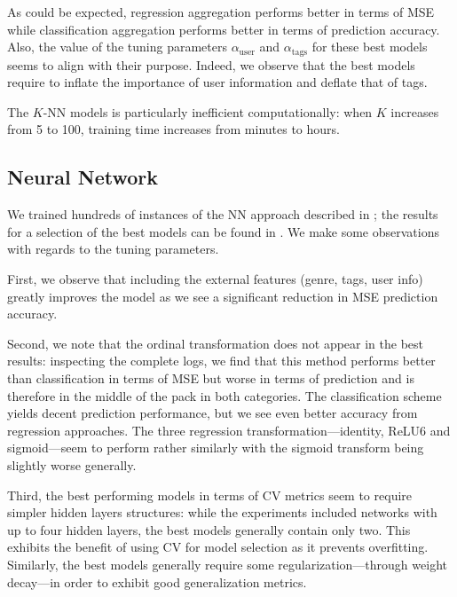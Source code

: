 \documentclass[bj, preprint]{imsart}
\begin{document}
As could be expected, regression aggregation performs better in terms of MSE while classification aggregation performs better in terms of prediction accuracy. Also, the value of the tuning parameters $\alpha_\text{user}$ and $\alpha_\text{tags}$ for these best models seems to align with their purpose. Indeed, we observe that the best models require to inflate the importance of user information and deflate that of tags.

The  $K$-NN models is particularly inefficient computationally: when $K$ increases from 5 to 100, training time increases from minutes to hours.




\subsection{Neural Network}\label{sebsec:results.nn}

We trained hundreds of instances of the NN approach described in ; the results for a selection of the best models can be found in . We make some observations with regards to the tuning parameters.

First, we observe that including the external features (genre, tags, user info) greatly improves the model as we see a significant reduction in MSE prediction accuracy. 

Second, we note that the ordinal transformation does not appear in the best results: inspecting the complete logs, we find that this method performs better than classification in terms of MSE but worse in terms of prediction and is therefore in the middle of the pack in both categories. The classification scheme yields decent prediction performance, but we see even better accuracy from regression approaches. The three regression transformation---identity, ReLU6 and sigmoid---seem to perform rather similarly with the sigmoid transform being slightly worse generally.

Third, the best performing models in terms of CV metrics seem to require simpler hidden layers structures: while the experiments included networks with up to four hidden layers, the best models generally contain only two. This exhibits the benefit of using CV for model selection as it prevents overfitting. Similarly, the best models generally require some regularization---through weight decay---in order to exhibit good generalization metrics.
\end{document}
